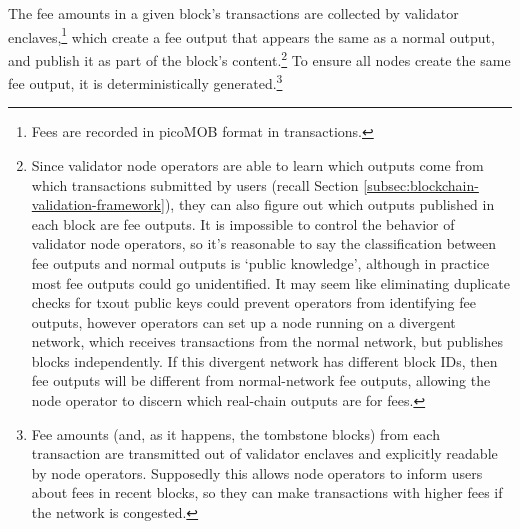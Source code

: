The fee amounts in a given block's transactions are collected by validator enclaves,\footnote{Fees are recorded in picoMOB format in transactions.} which create a fee output that appears the same as a normal output, and publish it as part of the block's content.\footnote{\label{footnote:fee-output-public-knowledge}Since validator node operators are able to learn which outputs come from which transactions submitted by users (recall Section \ref{subsec:blockchain-validation-framework}), they can also figure out which outputs published in each block are fee outputs. It is impossible to control the behavior of validator node operators, so it's reasonable to say the classification between fee outputs and normal outputs is `public knowledge', although in practice most fee outputs could go unidentified. It may seem like eliminating duplicate checks for txout public keys could prevent operators from identifying fee outputs, however operators can set up a node running on a divergent network, which receives transactions from the normal network, but publishes blocks independently. If this divergent network has different block IDs, then fee outputs will be different from normal-network fee outputs, allowing the node operator to discern which real-chain outputs are for fees.} To ensure all nodes create the same fee output, it is deterministically generated.\footnote{Fee amounts (and, as it happens, the tombstone blocks) from each transaction are transmitted out of validator enclaves and explicitly readable by node operators. Supposedly this allows node operators to inform users about fees in recent blocks, so they can make transactions with higher fees if the network is congested.}

